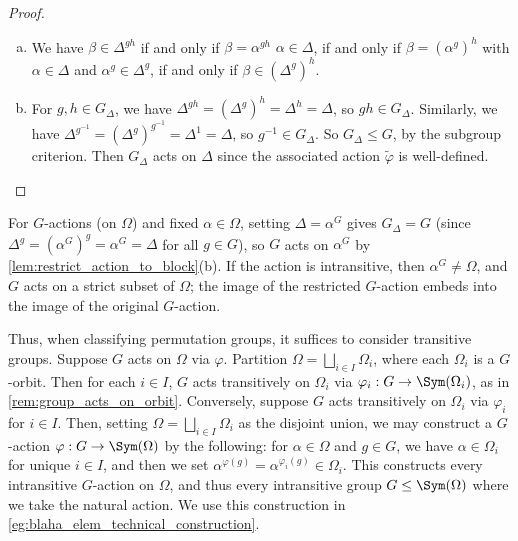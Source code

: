 \begin{proof}
    \begin{enumerate}[(a)]
        \item We have $\beta \in \Delta^{gh}$ if and only if $\beta = \alpha^{gh}$  $\alpha \in \Delta$, if and only if $\beta = (\alpha^g)^h$ with $\alpha \in \Delta$ and $\alpha^g \in \Delta^g$, if and only if $\beta \in (\Delta^g)^h$.
        \item For $g,h \in G_\Delta$, we have $\Delta^{gh} = (\Delta^g)^h = \Delta^h = \Delta$, so $gh \in G_\Delta$. Similarly, we have $\Delta^{g^{-1}} = (\Delta^g)^{g^{-1}} = \Delta^1 = \Delta$, so $g^{-1} \in G_\Delta$. So $G_\Delta \leq G$, by the subgroup criterion. Then $G_\Delta$ acts on $\Delta$ since the associated action $\tilde\varphi$ is well-defined.

    \end{enumerate}
\end{proof}

\begin{remark}\label{rem:group_acts_on_orbit}
    For $G$-actions (on $\Omega$) and fixed $\alpha \in \Omega$, setting $\Delta = \alpha^G$ gives $G_\Delta = G$ (since $\Delta^g = (\alpha^G)^g = \alpha^G = \Delta$ for all $g \in G$), so $G$ acts on $\alpha^G$ by \autoref{lem:restrict_action_to_block}(b). If the action is intransitive, then $\alpha^G \neq \Omega$, and $G$ acts on a strict subset of $\Omega$; the image of the restricted $G$-action embeds into the image of the original $G$-action.
\end{remark}

Thus, when classifying permutation groups, it suffices to consider transitive groups. Suppose $G$ acts on $\Omega$ via $\varphi$. Partition $\Omega = \bigsqcup_{i \in I} \Omega_i$, where each $\Omega_i$ is a $G$-orbit. Then for each $i \in I$, $G$ acts transitively on $\Omega_i$ via $\varphi_i : G \to \Sym(\Omega_i)$, as in \autoref{rem:group_acts_on_orbit}. Conversely, suppose $G$ acts transitively on $\Omega_i$ via $\varphi_i$ for $i \in I$. Then, setting $\Omega = \bigsqcup_{i \in I} \Omega_i$ as the disjoint union, we may construct a $G$-action $\varphi : G \to \Sym(\Omega)$ by the following: for $\alpha \in \Omega$ and $g \in G$, we have $\alpha \in \Omega_i$ for unique $i \in I$, and then we set $\alpha^{\varphi(g)} = \alpha^{\varphi_i(g)} \in \Omega_i$. This constructs every intransitive $G$-action on $\Omega$, and thus every intransitive group $G \leq \Sym(\Omega)$ where we take the natural action. We use this construction in \autoref{eg:blaha_elem_technical_construction}.

